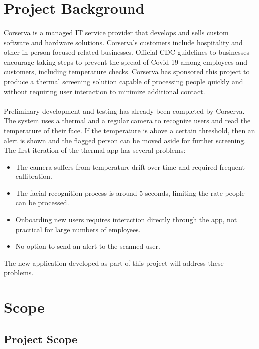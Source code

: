 \documentclass[12pt, letterpaper]{article}
\begin{document}
    
    \newpage
    \tableofcontents
    \newpage
    \listoffigures
    \newpage
    \section{Project Background}
    \paragraph{}
    Corserva is a managed IT service provider that develops and sells custom software and hardware solutions. Corserva's customers
    include hospitality and other in-person focused related businesses. Official CDC guidelines to businesses encourage taking steps to 
    prevent the spread of Covid-19 among employees and customers, including temperature checks. Corserva has sponsored this project 
    to produce a thermal screening solution capable of processing people quickly and without requiring user interaction to minimize additional
    contact.
    \paragraph{}
    Preliminary development and testing has already been completed by Corserva. The system uses a thermal and a regular 
    camera to recognize users and read the temperature of their face. If the temperature is above a certain threshold, 
    then an alert is shown and the flagged person can be moved aside for further screening.  The first iteration of the thermal app has several problems:
    \begin{itemize}
        \item The camera suffers from temperature drift over time and required frequent callibration.
        \item The facial recognition process is around 5 seconds, limiting the rate people can be processed.
        \item Onboarding new users requires interaction directly through the app, not practical for large numbers of employees.
        \item No option to send an alert to the scanned user.
    \end{itemize}
    The new application developed as part of this project will address these problems.
    \section{Scope}
    \subsection{Project Scope}
\end{document}
